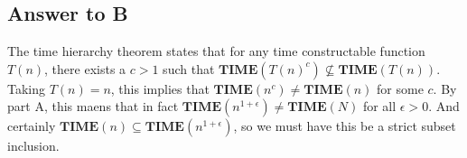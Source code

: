 \documentclass{article}
\newcommand{\TIME}{\mathbf{TIME}}
\begin{document}
	\subsection*{Answer to B}

	The time hierarchy theorem states that for any time constructable function $T(n)$, there exists a $c > 1$ such that $\TIME(T(n)^c) \not\subseteq \TIME(T(n))$.
	Taking $T(n) = n$, this implies that $\TIME(n^c) \neq \TIME(n)$ for some $c$.
	By part A, this maens that in fact $\TIME(n^{1 + \epsilon}) \neq \TIME(N)$ for all $\epsilon > 0$.  And certainly $\TIME(n) \subseteq \TIME(n^{1 + \epsilon})$, so we must have this be a strict subset inclusion.

		
\end{document}
